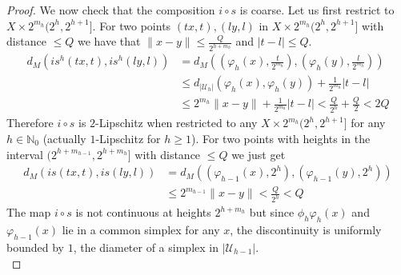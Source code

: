 \documentclass[a4paper,11pt]{article}
\theoremstyle{definition}
\theoremstyle{plain}
\theoremstyle{remark}
\begin{document}
{\begin{proof}
We now check that the composition $i \circ s$ is coarse. Let us first restrict to $X\times 2^{m_{h}} (2^h,2^{h+1}]$. For two points $(tx,t), (ly,l)$ in  $X\times 2^{m_{h}} (2^h,2^{h+1}]$ with distance  $\leq Q$ we have that $\|x-y\|\leq \frac{Q}{2^{h+m_{h}}}$ and $|t-l|\leq Q$. 
\begin{align*}
 d_{M}(i  s^{h}(tx,t), i s^{h}(ly,l)) &= d_{M} ( (\varphi_{h}(x),\frac{t}{2^{m_{h}}}), (\varphi_{h}(y), \frac{l}{2^{m_{h}}}))\\
& \leq d_{|\mathcal{U}_{h}|}(\varphi_{h}(x),\varphi_{h}(y)) + \frac{1}{2^{m_{h}}}|t-l|\\
 &\leq 2^{m_{h}} \|x-y\| +  \frac{1}{2^{m_{h}}}|t-l|< \frac{Q}{2^h} + \frac{Q}{2} < 2Q
\end{align*}
Therefore $i \circ s$ is $2$-Lipschitz when restricted to any $X\times 2^{m_{h}}(2^h,2^{h+1}]$ for any $h\in \mathbb{N}_{0}$ (actually $1$-Lipschitz for $h\geq 1$). For two points with heights in the interval $(2^{h+m_{h-1}}, 2^{h+m_{h}}]$ with distance $\leq Q$ we just get
\begin{align*}
 d_{M}(i s(tx,t), i s(ly,l)) &= d_{M} ( (\varphi_{h-1}(x), 2^h), (\varphi_{h-1}(y), 2^h))\\
 &\leq 2^{m_{h-1}}\|x-y\| < \frac{Q}{2^h} <Q
\end{align*}
The map $i \circ s$ is not continuous at heights $2^{h+m_{h}}$ but since $\phi_{h} \varphi_{h}(x)$ and $\varphi_{h-1}(x)$ lie in a common simplex for any $x$, the discontinuity is uniformly bounded by $1$, the diameter of a simplex in $|\mathcal{U}_{h-1}|$. \\


\end{proof}}
\end{document}
